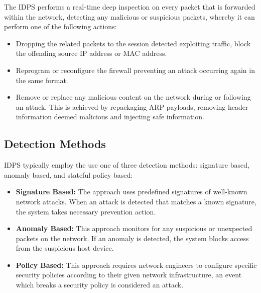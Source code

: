 \documentclass[12pt, oneside]{book}
\begin{document}
The IDPS performs a real-time deep inspection on every packet that is forwarded within the network,
detecting any malicious or suspicious packets, whereby it can perform one of the following actions:
\begin{itemize}
  \itemsep0em
  \item Dropping the related packets to the session detected exploiting traffic, block the offending source IP address or
        MAC address.
  \item Reprogram or reconfigure the firewall preventing an attack occurring again in the same format.
  \item Remove or replace any malicious content on the network during or following an attack.
        This is achieved by repackaging ARP payloads, removing header information deemed malicious and injecting safe information.
\end{itemize}



\subsection{Detection Methods}
IDPS typically employ the use one of three detection methods: signature based, anomaly based,
and stateful policy based:

\begin{itemize}
  \itemsep0em
  \item \textbf{Signature Based:} The approach uses predefined signatures of well-known network attacks. When an attack is detected that matches a known signature, the system takes necessary prevention action.
  \item \textbf{Anomaly Based:} This approach monitors for any suspicious or unexpected packets on the network. If an anomaly is detected, the system blocks access from the suspicious host device.
  \item \textbf{Policy Based:} This approach requires network engineers to configure specific security policies according to their given network infrastructure,
        an event which breaks a security policy is considered an attack.
\end{itemize}


\end{document}
